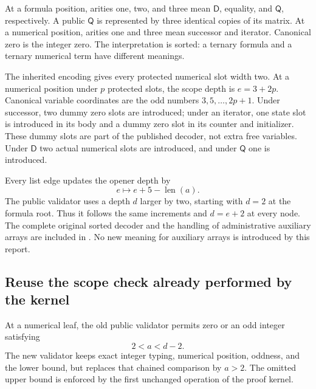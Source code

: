 \documentclass[11pt]{article}
\theoremstyle{definition}\newtheorem{definition}[theorem]{Definition}
\theoremstyle{remark}\newtheorem{remark}[theorem]{Remark}
\newcommand{\Q}{\mathsf Q}
\newcommand{\D}{\mathsf D}
\begin{document}
At a formula position, arities one, two, and three mean $\D$, equality,
and $\Q$, respectively. A public $\Q$ is represented by three identical
copies of its matrix. At a numerical position, arities one and three
mean successor and iterator. Canonical zero is the integer zero.
The interpretation is sorted: a ternary formula and a ternary numerical
term have different meanings.

The inherited encoding gives every protected numerical slot width two.
At a numerical position under $p$ protected slots, the scope depth is
$e=3+2p$. Canonical variable coordinates are the odd numbers
$3,5,\ldots,2p+1$. Under successor, two dummy zero slots are introduced;
under an iterator, one state slot is introduced in its body and a dummy
zero slot in its counter and initializer. These dummy slots are part of
the published decoder, not extra free variables. Under $\D$ two actual
numerical slots are introduced, and under $\Q$ one is introduced.

Every list edge updates the opener depth by
\[
                         e\longmapsto e+5-\operatorname{len}(a).
\]
The public validator uses a depth $d$ larger by two, starting with
$d=2$ at the formula root. Thus it follows the same increments and
$d=e+2$ at every node. The complete original sorted decoder and the
handling of administrative auxiliary arrays are included in
. No new meaning
for auxiliary arrays is introduced by this report.

\subsection{Reuse the scope check already performed by the kernel}

At a numerical leaf, the old public validator permits zero or an odd
integer satisfying
\[
                          2<a<d-2.
\]
The new validator keeps exact integer typing, numerical position,
oddness, and the lower bound, but replaces that chained comparison by
$a>2$. The omitted upper bound is enforced by the first unchanged
operation of the proof kernel.
\end{document}
